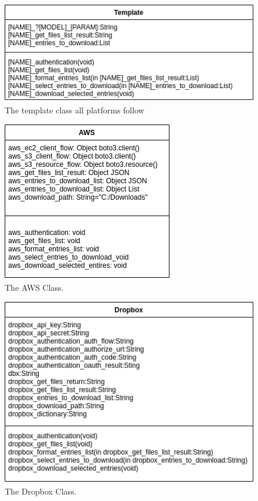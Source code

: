 \documentclass{article}
\begin{document}
\begin{figure}[p]
\includegraphics[scale=.5]{des_template}
\centering
\caption{The template class all platforms follow}
\end{figure}

\begin{figure}[p]
\includegraphics[scale=.5]{des_aws}
\centering
\caption{The AWS Class.}
\end{figure}

\begin{figure}[p]
\includegraphics[scale=.5]{des_dropbox}
\centering
\caption{The Dropbox Class.}
\end{figure}
\end{document}
